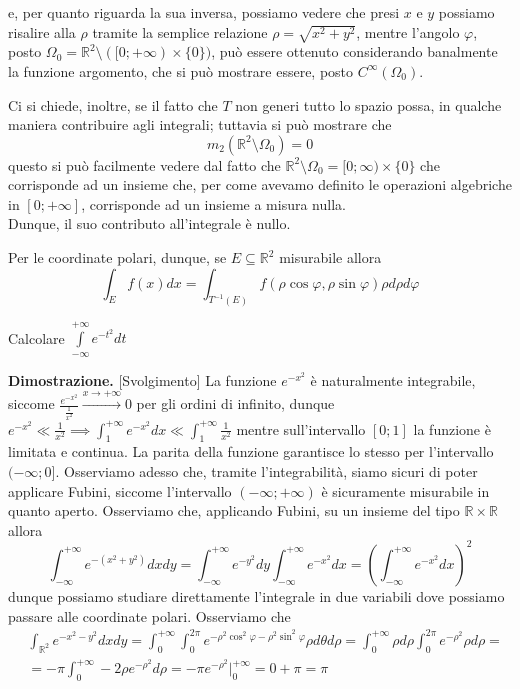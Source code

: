 %
e, per quanto riguarda la sua inversa, possiamo vedere che presi $x$ e $y$ possiamo risalire alla $\rho$ tramite la semplice relazione $\rho = \sqrt{x^2 + y^2}$, mentre 
l'angolo $\varphi$, posto $\Omega_0 = \mathbb{R}^2 \setminus ([0; +\infty) \times \{0\})$, può essere ottenuto considerando banalmente la funzione argomento, che si può mostrare essere, posto  $C^{\infty}(\Omega_0)$. 
%
\begin{remark}
Ci si chiede, inoltre, se il fatto che $T$ non generi tutto lo spazio possa, in qualche maniera contribuire agli integrali; tuttavia si può mostrare che
$$
m_2(\mathbb{R}^2 \setminus \Omega_0) = 0
$$
questo si può facilmente vedere dal fatto che $\mathbb{R}^2 \setminus \Omega_0 = [0; \infty) \times \{0\}$ che corrisponde ad un insieme che, per come avevamo definito le operazioni algebriche in $[0; +\infty]$, corrisponde ad un insieme a misura nulla. \\
Dunque, il suo contributo all'integrale è nullo.
\end{remark}
%
Per le coordinate polari, dunque, se $E \subseteq \mathbb{R}^2$ misurabile allora
%
\begin{equation}
	\int_E f(x)dx = \int_{T^{-1}(E)} f(\rho \cos{\varphi}, \rho \sin{\varphi}) \rho d\rho d\varphi
\end{equation}
%
\vspace{0.5cm}
\begin{exercise}
	Calcolare $\int\limits_{-\infty}^{+\infty} e^{-t^2} dt$
\end{exercise}
%
\noindent \textbf{Dimostrazione. }[Svolgimento]
	La funzione $e^{-x^2}$ è naturalmente integrabile, siccome $\frac{e^{-x^2}}{\frac{1}{x^2}} \stackrel{x \to +\infty}{\to} 0$ per gli ordini di infinito, dunque $e^{-x^2} \ll \frac{1}{x^2} \implies \int_1^{+\infty} e^{-x^2} dx \ll \int_1^{+\infty} \frac{1}{x^2}$ mentre sull'intervallo $[0; 1]$ la funzione è limitata e continua. La parita della funzione garantisce lo stesso per l'intervallo $(-\infty; 0]$. Osserviamo
	adesso che, tramite l'integrabilità, siamo sicuri di poter applicare Fubini, siccome l'intervallo $(-\infty; +\infty)$ è sicuramente misurabile in quanto aperto. Osserviamo che, applicando Fubini, su un insieme del tipo $\mathbb{R} \times \mathbb{R}$ allora
	$$
	\int_{-\infty}^{+\infty} e^{-(x^2 + y^2)}dxdy = \int_{-\infty}^{+\infty} e^{-y^2} dy \int_{-\infty}^{+\infty} e^{-x^2} dx = (\int_{-\infty}^{+\infty} e^{-x^2}dx)^2
	$$
	dunque possiamo studiare direttamente l'integrale in due variabili dove possiamo passare alle coordinate polari. Osserviamo che
	\[\begin{aligned}
	&\int_{\mathbb{R}^2} e^{-x^2 - y^2} dxdy = \int_{0}^{+\infty} \int_{0}^{2\pi} e^{-\rho^2 \cos^2{\varphi} - \rho^2 \sin^2{\varphi}} \rho d\theta d\rho = \int_0^{+\infty} \rho d\rho \int_{0}^{2 \pi} e^{-\rho^2} \rho d\rho = \\
	&=-\pi \int_0^{+\infty} -2 \rho e^{-\rho^2} d\rho = - \pi e^{-\rho^2}\Bigg|^{+\infty}_{0} =0 + \pi = \pi
	\end{aligned}\]
